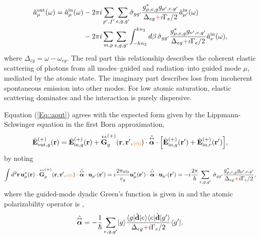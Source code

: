 \begin{align} \label{Eq::aout}
\hat{a}^{\out}_\mu (\omega) = \hat{a}^{\inp}_\mu (\omega) &- 2\pi i\sum_{p',f'} 
\sum_{e,g,g'}\!\hat{\sigma}_{gg'}\frac{ g_{\mu,e,g}^* g_{\mu',e,g'}}{ \Delta_{eg} \error{+} i \Gamma_{e}/2 }\hat{a}^{\inp}_{\mu'}(\omega) \\
&- 2\pi i\sum_{m,p} \sum_{e,g,g'} \int^{kn_2}_{-kn_2} d\beta \,\hat{\sigma}_{gg'}\frac{ g_{\mu,e,g}^* g_{\nu',e,g'}}{ \Delta_{eg} \error{+} i \Gamma_{e}/2 }\hat{a}^{\inp}_{\nu}(\omega),\nn
\end{align}
where $\Delta_{eg} = \omega - \omega_{eg}$.  The real part this relationship describes the coherent elastic scattering of photons from all modes--guided and radiation--into guided mode $\mu$, mediated by the atomic state.  The imaginary part describes loss from incoherent spontaneous emission into other modes.  For low atomic saturation, elastic scattering dominates and the interaction is purely dispersive. 

Equation (\ref{Eq::aout}) agrees with the expected form given by the Lippmann-Schwinger equation in the first Born approximation,
	\begin{equation} \label{Eq::IOScatteredField}
		\hat{\mathbf{E}}^{(+)}_{\out,g}(\br)=\hat{\mathbf{E}}^{(+)}_{ \inp, g}(\br)+\tensor{\mathbf{G}}_g^{(+)}(\br,\br',\comment{\omega_0})\cdot \poltens \cdot \Big[\hat{\mathbf{E}}^{(+)}_{\inp, g}(\br')+\hat{\mathbf{E}}^{(+)}_{\inp,r}(\br') \Big],
	\end{equation}
by noting
	\begin{equation}
		\int d^2 \mbf{r} \, \mathbf{u}^*_{\mu} (\br)\cdot \tensor{\mathbf{G}}_g^{(+)}(\br,\br',\comment{\omega_0})\cdot 
\poltens \cdot \mathbf{u}_{\mu'} (\br') =  i \frac{ 2\pi \omega_0}{v_g} \mathbf{u}^*_\mu 
 (\br') \cdot \poltens \cdot \mathbf{u}_{\mu'} (\br') = - i \frac{2 \pi}{\hbar} \sum_{e,g,g'}\!\ 
 \hat{\sigma}_{gg'} \frac{g_{\mu,e,g}^* g_{\mu',e,g'}}{ \Delta_{eg} \error{+} i \Gamma_{e}/2 }, 
	\end{equation}
where the guided-mode dyadic Green's function is given in  and the atomic polarizability operator is \cite{Buhmann2004, Deutsch2010a,LeKien2013a},
	\begin{equation} \label{Eq::PolarizabilityOperator}
		\poltens = - \frac{1}{\hbar} \sum_{e,g,g'}\ket{g}\frac{\bra{g}\hat{\mathbf{d}}\ket{e}\bra{e} 
\hat{\mathbf{d}}\ket{g'}}{\Delta_{eg}  \error{+} i \Gamma_{e}/2 }\bra{g'}.
	\end{equation}
	
